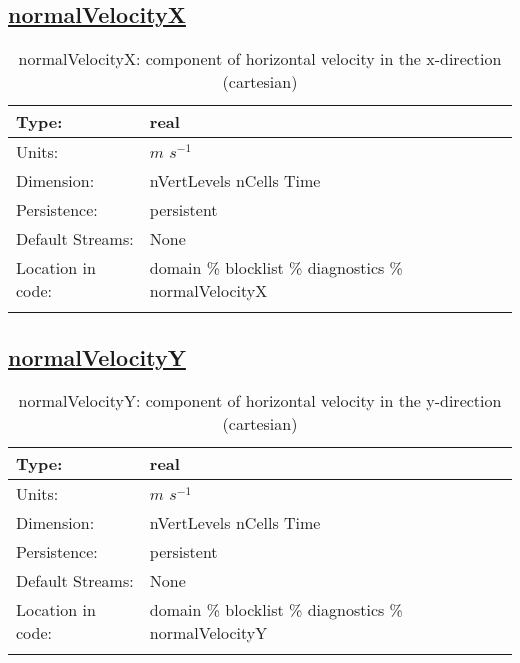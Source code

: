 \subsection[normalVelocityX]{\hyperref[sec:var_tab_diagnostics]{normalVelocityX}}
\label{subsec:var_sec_diagnostics_normalVelocityX}
\begin{center}
\begin{longtable}{| p{2.0in} | p{4.0in} |}
        \hline 
        Type: & real \\
        \hline 
        Units: & $m$ $s^{-1}$ \\
        \hline 
        Dimension: & nVertLevels nCells Time \\
        \hline 
        Persistence: & persistent \\
        \hline 
		 Default Streams: & None \\
        \hline 
		 Location in code: & domain \% blocklist \% diagnostics \% normalVelocityX \\
		 \hline 
    \caption{normalVelocityX: component of horizontal velocity in the x-direction (cartesian)}
\end{longtable}
\end{center}
\subsection[normalVelocityY]{\hyperref[sec:var_tab_diagnostics]{normalVelocityY}}
\label{subsec:var_sec_diagnostics_normalVelocityY}
\begin{center}
\begin{longtable}{| p{2.0in} | p{4.0in} |}
        \hline 
        Type: & real \\
        \hline 
        Units: & $m$ $s^{-1}$ \\
        \hline 
        Dimension: & nVertLevels nCells Time \\
        \hline 
        Persistence: & persistent \\
        \hline 
		 Default Streams: & None \\
        \hline 
		 Location in code: & domain \% blocklist \% diagnostics \% normalVelocityY \\
		 \hline 
    \caption{normalVelocityY: component of horizontal velocity in the y-direction (cartesian)}
\end{longtable}
\end{center}

